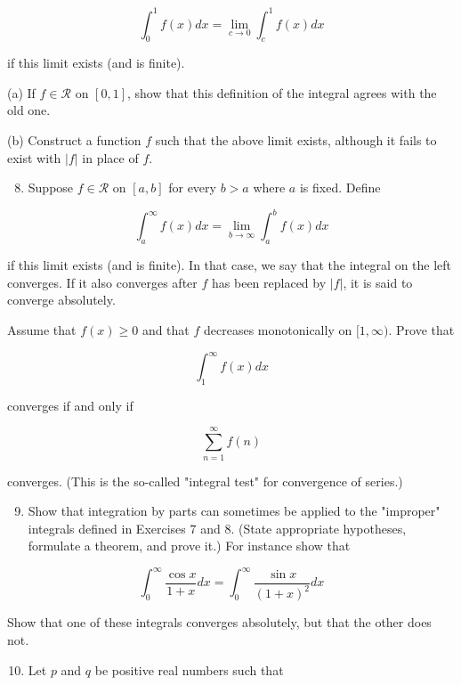 \documentclass[10pt]{article}
\begin{document}
$$
\int_{0}^{1} f(x) d x=\lim _{c \rightarrow 0} \int_{c}^{1} f(x) d x
$$

if this limit exists (and is finite).

(a) If $f \in \mathscr{R}$ on $[0,1]$, show that this definition of the integral agrees with the old one.

(b) Construct a function $f$ such that the above limit exists, although it fails to exist with $|f|$ in place of $f$.

\begin{enumerate}
  \setcounter{enumi}{7}
  \item Suppose $f \in \mathscr{R}$ on $[a, b]$ for every $b>a$ where $a$ is fixed. Define
\end{enumerate}

$$
\int_{a}^{\infty} f(x) d x=\lim _{b \rightarrow \infty} \int_{a}^{b} f(x) d x
$$

if this limit exists (and is finite). In that case, we say that the integral on the left converges. If it also converges after $f$ has been replaced by $|f|$, it is said to converge absolutely.

Assume that $f(x) \geq 0$ and that $f$ decreases monotonically on $[1, \infty)$. Prove that

$$
\int_{1}^{\infty} f(x) d x
$$

converges if and only if

$$
\sum_{n=1}^{\infty} f(n)
$$

converges. (This is the so-called "integral test" for convergence of series.)

\begin{enumerate}
  \setcounter{enumi}{8}
  \item Show that integration by parts can sometimes be applied to the "improper" integrals defined in Exercises 7 and 8. (State appropriate hypotheses, formulate a theorem, and prove it.) For instance show that
\end{enumerate}

$$
\int_{0}^{\infty} \frac{\cos x}{1+x} d x=\int_{0}^{\infty} \frac{\sin x}{(1+x)^{2}} d x
$$

Show that one of these integrals converges absolutely, but that the other does not.

\begin{enumerate}
  \setcounter{enumi}{9}
  \item Let $p$ and $q$ be positive real numbers such that
\end{enumerate}
\end{document}

